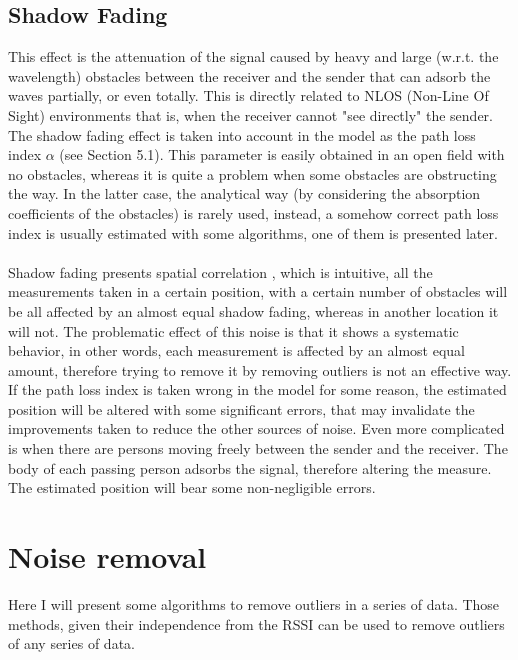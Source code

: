 \documentclass[12pt]{report}
\begin{document}
\section{Shadow Fading}
This effect is the attenuation of the signal caused by heavy and large (w.r.t. the wavelength) obstacles between the receiver and the sender that can adsorb the waves partially, or even totally. This is directly related to NLOS (Non-Line Of Sight) environments that is, when the receiver cannot "see directly" the sender. The shadow fading effect is taken into account in the model as the path loss index $\alpha$ (see Section 5.1). This parameter is easily obtained in an open field with no obstacles, whereas it is quite a problem when some obstacles are obstructing the way. In the latter case, the analytical way (by considering the absorption coefficients of the obstacles) is rarely used, instead, a somehow correct path loss index is usually estimated with some algorithms, one of them is presented later.\\\\ 
Shadow fading presents spatial correlation \cite{244122,732812}, which is intuitive, all the measurements taken in a certain position, with a certain number of obstacles will be all affected by an almost equal shadow fading, whereas in another location it will not. The problematic effect of this noise is that it shows a systematic behavior, in other words, each measurement is affected by an almost equal amount, therefore trying to remove it by removing outliers is not an effective way. If the path loss index is taken wrong in the model for some reason, the estimated position will be altered with some significant errors, that may invalidate the improvements taken to reduce the other sources of noise. Even more complicated is when there are persons moving freely between the sender and the receiver. The body of each passing person adsorbs the signal, therefore altering the measure. The estimated position will bear some non-negligible errors.

\chapter{Noise removal}
Here I will present some algorithms to remove outliers in a series of data. Those methods, given their independence from the RSSI can be used to remove outliers of any series of data.
\end{document}
